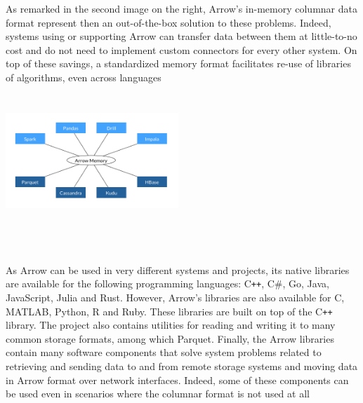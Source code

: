 \documentclass[10pt, a4paper]{report}
\begin{document}
\begin{itemize}
\begin{minipage}{0.92\textwidth}
\begin{multicols}{2}
\begin{center}
			\end{center}
		\end{multicols}
		\begin{multicols}{2}
			As remarked in the second image on the right, Arrow's in-memory columnar data format represent then an out-of-the-box solution to these problems. Indeed, systems using or supporting Arrow can transfer data between them at little-to-no cost and do not need to implement custom connectors for every other system. On top of these savings, a standardized memory format facilitates re-use of libraries of algorithms, even across languages
			\columnbreak
			\begin{center}
				\includegraphics[height=5cm,width=6.5cm]{./assets/img/arrow/with_arrow.png}
			\end{center}
		\end{multicols}
	\end{minipage} \\
	\begin{minipage}{0.92\textwidth}
		\item As Arrow can be used in very different systems and projects, its native libraries are available for the following programming languages: C\texttt{++}, C\#, Go, Java, JavaScript, Julia and Rust. However, Arrow's libraries are also available for C, MATLAB, Python, R and Ruby. These libraries are built on top of the C\texttt{++} library.
		The project also contains utilities for reading and writing it to many common storage formats, among which Parquet.
		Finally, the Arrow libraries contain many software components that solve system problems related to retrieving and sending data to and from remote storage systems and moving data in Arrow format over network interfaces. Indeed, some of these components can be used even in scenarios where the columnar format is not used at all\cite{arrow_overview}
	\end{minipage} \\
\end{itemize}
\end{document}
